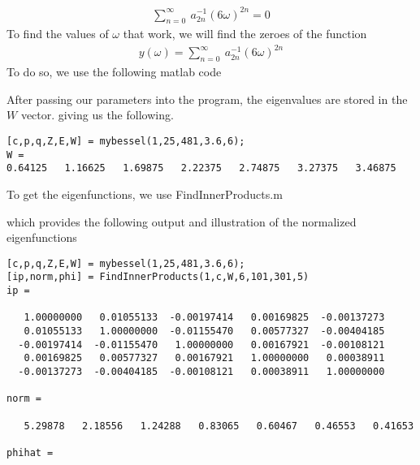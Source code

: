 \documentclass[11pt]{SelfArxOneColBMN}
\begin{document}
\begin{exercise}
\begin{solution}
    \begin{eqnarray*}
      \sum_{n=0}^\infty\:a_{2n}^{-1}(6\omega)^{2n} = 0
    \end{eqnarray*}
    To find the values of $\omega$ that work, we will find the zeroes of the function
    \begin{eqnarray*}
      y(\omega) = \sum_{n=0}^\infty\:a_{2n}^{-1}(6\omega)^{2n}
    \end{eqnarray*}
    To do so, we use the following matlab code
    \singlespacing
    
    \onehalfspacing
    After passing our parameters into the program, the eigenvalues are stored in the $W$ vector. giving us the following.
    \begin{lstlisting}
[c,p,q,Z,E,W] = mybessel(1,25,481,3.6,6);
W = 
0.64125   1.16625   1.69875   2.22375   2.74875   3.27375   3.46875
    \end{lstlisting}
    To get the eigenfunctions, we use FindInnerProducts.m
    \singlespacing
    
    \onehalfspacing
    which provides the following output and illustration of the normalized eigenfunctions
    \begin{lstlisting}
[c,p,q,Z,E,W] = mybessel(1,25,481,3.6,6);
[ip,norm,phi] = FindInnerProducts(1,c,W,6,101,301,5)
ip =

   1.00000000   0.01055133  -0.00197414   0.00169825  -0.00137273
   0.01055133   1.00000000  -0.01155470   0.00577327  -0.00404185
  -0.00197414  -0.01155470   1.00000000   0.00167921  -0.00108121
   0.00169825   0.00577327   0.00167921   1.00000000   0.00038911
  -0.00137273  -0.00404185  -0.00108121   0.00038911   1.00000000

norm =

   5.29878   2.18556   1.24288   0.83065   0.60467   0.46553   0.41653

phihat =


\end{lstlisting}
\end{solution}
\end{exercise}
\end{document}
